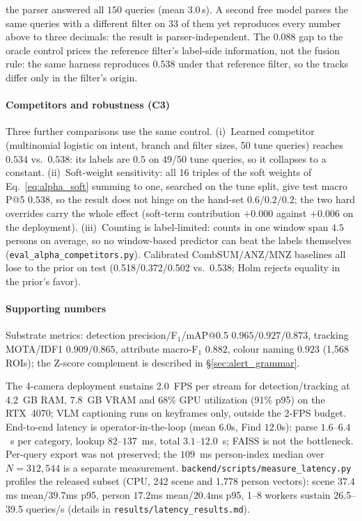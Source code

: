 ﻿\documentclass[conference]{IEEEtran}
\theoremstyle{plain}
\begin{document}
the parser answered all $150$ queries (mean $3.0$\,s). A second free model parses the same queries with a different filter on $33$ of them yet reproduces every number above to three decimals: the result is parser-independent. The $0.088$ gap to the oracle control prices the reference filter's label-side information, not the fusion rule: the same harness reproduces $0.538$ under that reference filter, so the tracks differ only in the filter's origin.

\paragraph*{Competitors and robustness (C3)} Three further comparisons use the same control. (i)~Learned competitor (multinomial logistic on intent, branch and filter sizes, 50 tune queries) reaches $0.534$ vs.\ $0.538$: its labels are $0.5$ on 49/50 tune queries, so it collapses to a constant. (ii)~Soft-weight sensitivity: all 16 triples of the soft weights of Eq.~\eqref{eq:alpha_soft} summing to one, searched on the tune split, give test macro P@5 $0.538$, so the result does not hinge on the hand-set $0.6/0.2/0.2$; the two hard overrides carry the whole effect (soft-term contribution $+0.000$ against $+0.006$ on the deployment). (iii)~Counting is label-limited: counts in one window span $4.5$ persons on average, so no window-based predictor can beat the labels themselves (\texttt{eval\_\allowbreak alpha\_\allowbreak competitors.py}). Calibrated CombSUM/ANZ/MNZ baselines all lose to the prior on test (0.518/0.372/0.502 vs.\ 0.538; Holm rejects equality in the prior's favor).

\paragraph*{Supporting numbers}
Substrate metrics: detection precision/F$_1$/mAP@0.5 $0.965/\allowbreak 0.927/\allowbreak 0.873$, tracking MOTA/IDF1 $0.909/\allowbreak 0.865$, attribute macro-F$_1$ $0.882$, colour naming $0.923$ (1{,}568 ROIs); the Z-score complement is described in \S\ref{sec:alert_grammar}.

The 4-camera deployment sustains 2.0~FPS per stream for detection/tracking at 4.2~GB RAM, 7.8~GB VRAM and 68\% GPU utilization (91\% p95) on the RTX~4070; VLM captioning runs on keyframes only, outside the 2-FPS budget. End-to-end latency is operator-in-the-loop (mean $6.0$s, Find $12.0$s): parse $1.6$--$6.4$~s per category, lookup $82$--$137$~ms, total $3.1$--$12.0$~s; FAISS is not the bottleneck. Per-query export was not preserved; the $109$~ms person-index median over $N{=}312{,}544$ is a separate measurement. \texttt{backend/\allowbreak scripts/\allowbreak measure\_\allowbreak latency.py} profiles the released subset (CPU, 242 scene and 1{,}778 person vectors): scene $37.4$ms mean/$39.7$ms p95, person $17.2$ms mean/$20.4$ms p95, 1--8 workers sustain 26.5--39.5 queries/s (details in \texttt{results/latency\_results.md}).
\end{document}
